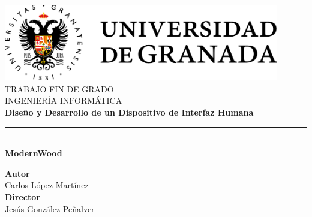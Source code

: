 
\begin{titlepage}
\newlength{\centeroffset}
\setlength{\centeroffset}{-0.5\oddsidemargin}
\addtolength{\centeroffset}{0.5\evensidemargin}
\thispagestyle{empty}

\noindent\hspace*{\centeroffset}\begin{minipage}{\textwidth}
\centering
\includegraphics[width=0.9\textwidth]{imagenes/logo_ugr.png}\\[1.4cm]

\textsc{\Large TRABAJO FIN DE GRADO\\[0.2cm]}
\textsc{INGENIERÍA INFORMÁTICA}\\[1cm]
{\Huge\bfseries Diseño y Desarrollo de un Dispositivo de Interfaz Humana\\}
\noindent\rule[-1ex]{\textwidth}{3pt}\\[3.5ex]
{\large\bfseries ModernWood}
\end{minipage}
\vspace{1.5cm}

\noindent\hspace*{\centeroffset}\begin{minipage}{\textwidth}
\centering

\textbf{Autor}\\ {Carlos López Martínez}\\[2.5ex]
\textbf{Director}\\
Jesús González Peñalver\\[1.5cm]


\end{minipage}
\end{titlepage}
